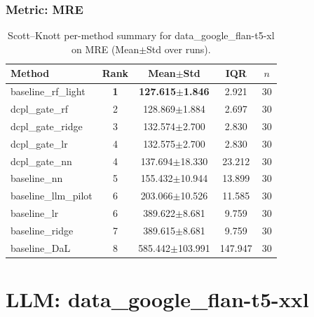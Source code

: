 \subsubsection*{Metric: MRE}
\begin{table}[H]
\centering
\scriptsize
\setlength{\tabcolsep}{4pt}
\renewcommand{\arraystretch}{1.1}
\caption{Scott--Knott per-method summary for data\_google\_flan-t5-xl on MRE (Mean$\pm$Std over runs).}
\label{tab:sk_data_google_flan-t5-xl_MRE}
\begin{tabular}{l|c|c|c|c}
\hline
\textbf{Method} & \textbf{Rank} & \textbf{Mean$\pm$Std} & \textbf{IQR} & \textbf{$n$} \\
\hline
\rowcolor{red!15} baseline\_rf\_light & \textbf{1} & \textbf{127.615$\pm$1.846} & 2.921 & 30 \\
dcpl\_gate\_rf & 2 & 128.869$\pm$1.884 & 2.697 & 30 \\
dcpl\_gate\_ridge & 3 & 132.574$\pm$2.700 & 2.830 & 30 \\
dcpl\_gate\_lr & 4 & 132.575$\pm$2.700 & 2.830 & 30 \\
dcpl\_gate\_nn & 4 & 137.694$\pm$18.330 & 23.212 & 30 \\
baseline\_nn & 5 & 155.432$\pm$10.944 & 13.899 & 30 \\
baseline\_llm\_pilot & 6 & 203.066$\pm$10.526 & 11.585 & 30 \\
baseline\_lr & 6 & 389.622$\pm$8.681 & 9.759 & 30 \\
baseline\_ridge & 7 & 389.615$\pm$8.681 & 9.759 & 30 \\
baseline\_DaL & 8 & 585.442$\pm$103.991 & 147.947 & 30 \\
\hline
\end{tabular}
\end{table}


\newpage

\section*{LLM: data\_google\_flan-t5-xxl}

